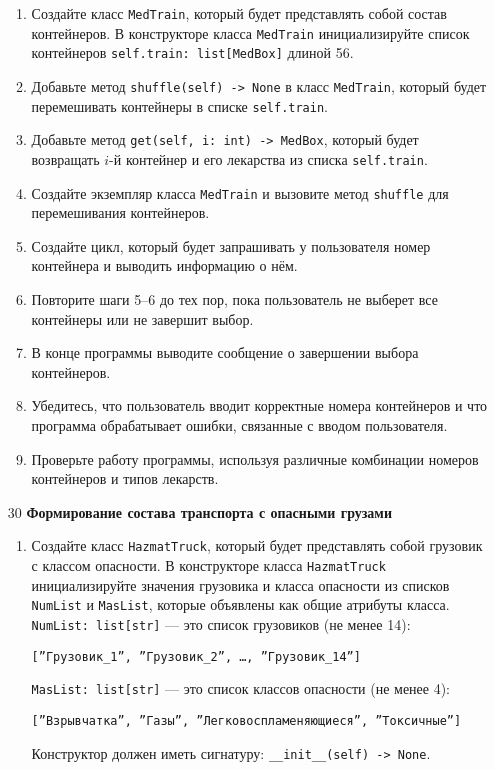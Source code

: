 \begin{enumerate}
\begin{enumerate}
    \item Создайте класс \texttt{MedTrain}, который будет представлять собой состав контейнеров. В конструкторе класса \texttt{MedTrain} инициализируйте список контейнеров \texttt{self.train: list[MedBox]} длиной 56.

    \item Добавьте метод \texttt{shuffle(self) -> None} в класс \texttt{MedTrain}, который будет перемешивать контейнеры в списке \texttt{self.train}.

    \item Добавьте метод \texttt{get(self, i: int) -> MedBox}, который будет возвращать $i$-й контейнер и его лекарства из списка \texttt{self.train}.

    \item Создайте экземпляр класса \texttt{MedTrain} и вызовите метод \texttt{shuffle} для перемешивания контейнеров.

    \item Создайте цикл, который будет запрашивать у пользователя номер контейнера и выводить информацию о нём.

    \item Повторите шаги 5–6 до тех пор, пока пользователь не выберет все контейнеры или не завершит выбор.

    \item В конце программы выводите сообщение о завершении выбора контейнеров.

    \item Убедитесь, что пользователь вводит корректные номера контейнеров и что программа обрабатывает ошибки, связанные с вводом пользователя.

    \item Проверьте работу программы, используя различные комбинации номеров контейнеров и типов лекарств.
\end{enumerate}

\item[30] \textbf{Формирование состава транспорта с опасными грузами}
\begin{enumerate}
    \item Создайте класс \texttt{HazmatTruck}, который будет представлять собой грузовик с классом опасности. В конструкторе класса \texttt{HazmatTruck} инициализируйте значения грузовика и класса опасности из списков \texttt{NumList} и \texttt{MasList}, которые объявлены как общие атрибуты класса. \texttt{NumList: list[str]} — это список грузовиков (не менее 14): 
    \begin{center}
        \texttt{[''Грузовик\_1'', ''Грузовик\_2'', \dots, ''Грузовик\_14'']}
    \end{center}
    \texttt{MasList: list[str]} — это список классов опасности (не менее 4):
    \begin{center}
        \texttt{[''Взрывчатка'', ''Газы'', ''Легковоспламеняющиеся'', ''Токсичные'']}
    \end{center}
    Конструктор должен иметь сигнатуру: \texttt{\_\_init\_\_(self) -> None}.


\end{enumerate}
\end{enumerate}
